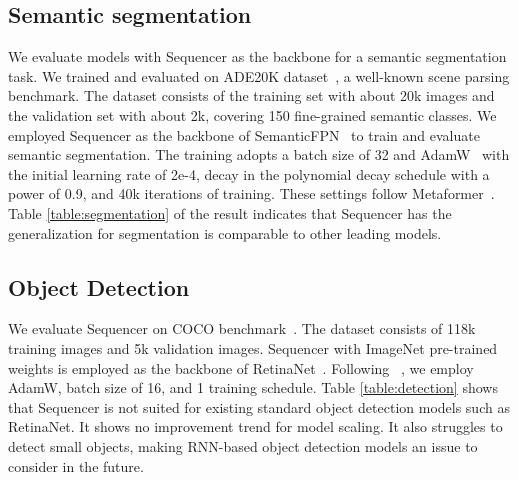 \documentclass{article}
\begin{document}
\subsection{Semantic segmentation}
\label{subsec:segmentation}
We evaluate models with Sequencer as the backbone for a semantic segmentation task. We trained and evaluated on ADE20K dataset~\cite{zhou2017scene}, a well-known scene parsing benchmark. The dataset consists of the training set with about 20k images and the validation set with about 2k, covering 150 fine-grained semantic classes. We employed Sequencer as the backbone of SemanticFPN~\cite{kirillov2019panoptic} to train and evaluate semantic segmentation. The training adopts a batch size of 32 and AdamW~\cite{loshchilov2017decoupled} with the initial learning rate of 2e-4, decay in the polynomial decay schedule with a power of 0.9, and 40k iterations of training. These settings follow Metaformer~\cite{yu2021metaformer}. Table \ref{table:segmentation}  of the result indicates that Sequencer has the generalization for segmentation is comparable to other leading models.

\subsection{Object Detection}
\label{subsec:detection}
We evaluate Sequencer on COCO benchmark~\cite{lin2014microsoft}. The dataset consists of 118k training images and 5k validation images. Sequencer with ImageNet pre-trained weights is employed as the backbone of RetinaNet~\cite{lin2017focal}. Following ~\cite{lin2017focal}, we employ AdamW, batch size of 16, and 1 training schedule. Table \ref{table:detection} shows that Sequencer is not suited for existing standard object detection models such as RetinaNet. It shows no improvement trend for model scaling. It also struggles to detect small objects, making RNN-based object detection models an issue to consider in the future.
\end{document}
